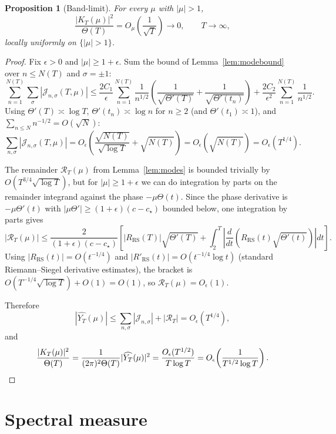 \documentclass[11pt]{article}
\newtheorem{proposition}[theorem]{Proposition}
\theoremstyle{definition}
\theoremstyle{remark}
\begin{document}
\begin{proposition}[Band-limit]\label{prop:bandlimit}
For every $\mu$ with $|\mu| > 1$,
\[
\frac{|K_T(\mu)|^2}{\Theta(T)} = O_\mu\!\left(\frac{1}{\sqrt T}\right) \longrightarrow 0,\qquad T \to \infty,
\]
locally uniformly on $\{|\mu| > 1\}$.
\end{proposition}

\begin{proof}
Fix $\epsilon > 0$ and $|\mu| \geq 1+\epsilon$. Sum the bound of Lemma~\ref{lem:modebound} over $n \leq N(T)$ and $\sigma = \pm 1$:
\[
\sum_{n=1}^{N(T)}\sum_{\sigma}|\mathcal J_{n,\sigma}(T,\mu)| \leq \frac{2C_1}{\epsilon}\sum_{n=1}^{N(T)}\frac{1}{n^{1/2}}\left(\frac{1}{\sqrt{\Theta'(T)}} + \frac{1}{\sqrt{\Theta'(t_n)}}\right) + \frac{2C_2}{\epsilon^2}\sum_{n=1}^{N(T)}\frac{1}{n^{1/2}}.
\]
Using $\Theta'(T) \asymp \log T$, $\Theta'(t_n) \asymp \log n$ for $n \geq 2$ (and $\Theta'(t_1) \asymp 1$), and $\sum_{n \leq N}n^{-1/2} = O(\sqrt N)$:
\[
\sum_{n,\sigma}|\mathcal J_{n,\sigma}(T,\mu)| = O_\epsilon\!\left(\frac{\sqrt{N(T)}}{\sqrt{\log T}} + \sqrt{N(T)}\right) = O_\epsilon(\sqrt{N(T)}) = O_\epsilon(T^{1/4}).
\]

The remainder $\mathcal R_T(\mu)$ from Lemma~\ref{lem:modes} is bounded trivially by $O(T^{3/4}\sqrt{\log T})$, but for $|\mu| \geq 1+\epsilon$ we can do integration by parts on the remainder integrand against the phase $-\mu\Theta(t)$. Since the phase derivative is $-\mu\Theta'(t)$ with $|\mu\Theta'| \geq (1+\epsilon)(c-c_\star)$ bounded below, one integration by parts gives
\[
|\mathcal R_T(\mu)| \leq \frac{2}{(1+\epsilon)(c-c_\star)}\left[|R_{\mathrm{RS}}(T)|\sqrt{\Theta'(T)} + \int_2^T\left|\frac{d}{dt}\!\left(R_{\mathrm{RS}}(t)\sqrt{\Theta'(t)}\right)\right|dt\right].
\]
Using $|R_{\mathrm{RS}}(t)| = O(t^{-1/4})$ and $|R'_{\mathrm{RS}}(t)| = O(t^{-1/4}\log t)$ (standard Riemann--Siegel derivative estimates), the bracket is $O(T^{-1/4}\sqrt{\log T}) + O(1) = O(1)$, so $\mathcal R_T(\mu) = O_\epsilon(1)$.

Therefore
\[
|\widehat{Y_T}(\mu)| \leq \sum_{n,\sigma}|\mathcal J_{n,\sigma}| + |\mathcal R_T| = O_\epsilon(T^{1/4}),
\]
and
\[
\frac{|K_T(\mu)|^2}{\Theta(T)} = \frac{1}{(2\pi)^2\Theta(T)}|\widehat{Y_T}(\mu)|^2 = \frac{O_\epsilon(T^{1/2})}{T\log T} = O_\epsilon\!\left(\frac{1}{T^{1/2}\log T}\right). \qedhere
\]
\end{proof}

\section{Spectral measure}
\end{document}
